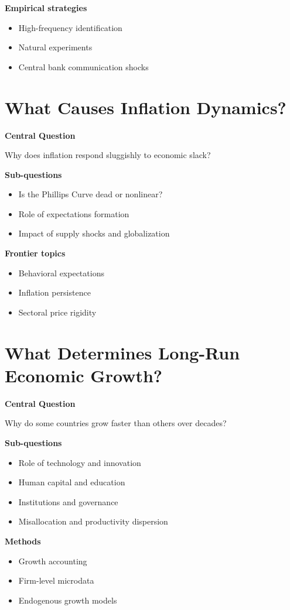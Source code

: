 \documentclass[12pt]{article}
\begin{document}
\textbf{Empirical strategies}
\begin{itemize}
\item High-frequency identification
\item Natural experiments
\item Central bank communication shocks
\end{itemize}

\section{What Causes Inflation Dynamics?}

\textbf{Central Question}

Why does inflation respond sluggishly to economic slack?

\textbf{Sub-questions}
\begin{itemize}
\item Is the Phillips Curve dead or nonlinear?
\item Role of expectations formation
\item Impact of supply shocks and globalization
\end{itemize}

\textbf{Frontier topics}
\begin{itemize}
\item Behavioral expectations
\item Inflation persistence
\item Sectoral price rigidity
\end{itemize}

\section{What Determines Long-Run Economic Growth?}

\textbf{Central Question}

Why do some countries grow faster than others over decades?

\textbf{Sub-questions}
\begin{itemize}
\item Role of technology and innovation
\item Human capital and education
\item Institutions and governance
\item Misallocation and productivity dispersion
\end{itemize}

\textbf{Methods}
\begin{itemize}
\item Growth accounting
\item Firm-level microdata
\item Endogenous growth models
\end{itemize}
\end{document}

